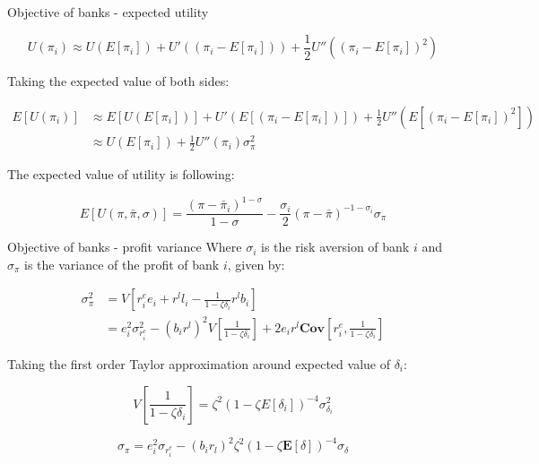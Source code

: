\documentclass{beamer}
\begin{document}
\begin{frame}{Objective of banks - expected utility}

    \[U(\pi_i) \approx U(E[\pi_i]) + U'((\pi_i - E[\pi_i])) + \frac{1}{2} U''((\pi_i - E[\pi_i])^2)\]

Taking the expected value of both sides:

\begin{equation}
  \begin{aligned}
    E[U(\pi_i)] &\approx E[U(E[\pi_i])] + U'(E[(\pi_i - E[\pi_i])]) + \frac{1}{2} U''(E[(\pi_i - E[\pi_i])^2]) \\
     &\approx U(E[\pi_i]) + \frac{1}{2} U''(\pi_i) \sigma^2_{\pi}
  \end{aligned}\nonumber
\end{equation}

The expected value of utility is following:

\[ E[U(\pi, \bar{\pi}, \sigma)] = \frac{(\pi - \bar{\pi}_i )^{1-\sigma}}{1 - \sigma} - \frac{\sigma_i}{2} (\pi - \bar{\pi})^{-1-\sigma_i} \sigma_\pi\]

\end{frame}

\begin{frame}{Objective of banks - profit variance}
    Where $\sigma_i$ is the risk aversion of bank $i$ and $\sigma_\pi$ is the variance of the profit of bank $i$, given by:
        
    \begin{equation}
        \begin{aligned}
          \sigma^2_\pi &= V[r^e_i e_i + r^l l_i - \frac{1}{1 - \zeta \delta_i} r^l b_i] \\
          &= e_i^2 \sigma^2_{r^e_i} - (b_i r^l)^2 V[\frac{1}{1 - \zeta \delta_i}] + 2 e_i r^l \textbf{Cov}[r^e_i, \frac{1}{1 - \zeta \delta_i}]
        \end{aligned}\nonumber
      \end{equation}
      
      Taking the first order Taylor approximation around expected value of $\delta_i$:
      
      \[V[\frac{1}{1 - \zeta \delta_i}] = \zeta^2 (1 - \zeta E[\delta_i])^{-4} \sigma^2_{\delta_i}\]

      \[\sigma_\pi = e_i^2 \sigma_{r_i^e} - (b_i  r_l)^2  \zeta^2 (1 - \zeta \mathbf{E}[\delta])^{-4}  \sigma_\delta\]
      
\end{frame}
\end{document}

